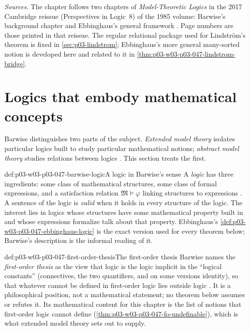 \emph{Sources.} The chapter follows two chapters of \emph{Model-Theoretic
Logics} in the 2017 Cambridge reissue (Perspectives in Logic~8) of the 1985
volume: Barwise's background chapter \cite[Ch.~I, pp.~3--23]{Barwise1985BackgroundAims}
and Ebbinghaus's general framework
\cite[Ch.~II, pp.~25--72]{Ebbinghaus1985ExtendedLogics}.
Page numbers are those printed in that reissue.  The regular relational
package used for Lindstr\"om's theorem is fixed in
\cref{sec:p03-lindstrom}; Ebbinghaus's more general many-sorted notion is
developed here and related to it in
\cref{thm:p03-w03-p03-047-lindstrom-bridge}.

\section{Logics that embody mathematical concepts}
\label{sec:p03-w03-p03-047-barwise-extended}

Barwise distinguishes two parts of the subject.  \emph{Extended model
theory} isolates particular logics built to study particular mathematical
notions; \emph{abstract model theory} studies relations between logics
\cite[Ch.~I, p.~3]{Barwise1985BackgroundAims}.  This section treats the first.

\begin{hbdefinition}{def:p03-w03-p03-047-barwise-logic}{A logic in Barwise's sense}
A \emph{logic} has three ingredients: some class of mathematical
structures, some class of formal expressions, and a satisfaction relation
\(\mathfrak M\models\varphi\) linking structures to expressions \cite[Ch.~I, \S1.1, p.~4]{Barwise1985BackgroundAims}.  A sentence of
the logic is \emph{valid} when it holds in every structure of the logic.
The interest lies in logics whose structures have some mathematical property
built in and whose expressions formalize talk about that property.
Ebbinghaus's \cref{def:p03-w03-p03-047-ebbinghaus-logic} is the exact
version used for every theorem below; Barwise's description is the informal
reading of it.
\end{hbdefinition}

\begin{hbdefinition}{def:p03-w03-p03-047-first-order-thesis}{The first-order thesis}
Barwise names the \emph{first-order thesis} as the view that logic is the
logic implicit in the ``logical constants'' (connectives, the two
quantifiers, and on some versions identity), so that whatever cannot be
defined in first-order logic lies outside logic
\cite[Ch.~I, \S1.2, p.~5]{Barwise1985BackgroundAims}.  It is a philosophical
position, not a mathematical statement; no theorem below assumes or refutes
it.  Its mathematical content for this chapter is the list of notions that
first-order logic cannot define (\cref{thm:p03-w03-p03-047-fo-undefinable}),
which is what extended model theory sets out to supply.
\end{hbdefinition}

